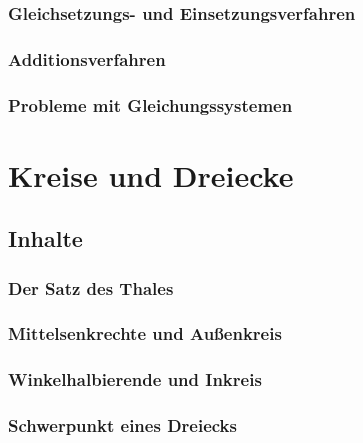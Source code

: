 \documentclass{article}
\begin{document}
\subsubsection*{Gleichsetzungs- und Einsetzungsverfahren}
\subsubsection*{Additionsverfahren}
\subsubsection*{Probleme mit Gleichungssystemen}
\newpage

\section{Kreise und Dreiecke}
\subsection{Inhalte}
\subsubsection*{Der Satz des Thales}
\subsubsection*{Mittelsenkrechte und Außenkreis}
\subsubsection*{Winkelhalbierende und Inkreis}
\subsubsection*{Schwerpunkt eines Dreiecks}
\end{document}
